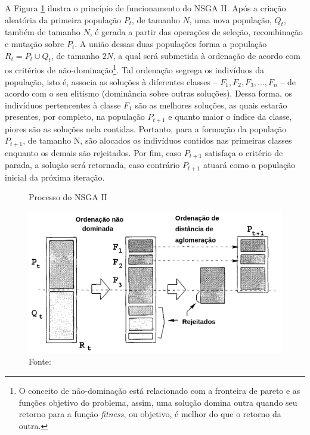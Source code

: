 \documentclass[11pt]{article}
\begin{document}
    A Figura \ref{fig:nsga2} ilustra o princípio de funcionamento do NSGA II. Após a criação aleatória da primeira população $P_t$, de tamanho $N$, uma nova população, $Q_t$, também de tamanho $N$, é gerada a partir das operações de seleção, recombinação e mutação sobre $P_t$. A união dessas duas populações forma a população $R_t = P_t \cup Q_t$, de tamanho $2N$, a qual será submetida à ordenação de acordo com os critérios de não-dominação\footnote{O conceito de não-dominação está relacionado com a fronteira de pareto e as funções objetivo do problema, assim, uma solução domina outra quando seu retorno para a função \textit{fitness}, ou objetivo, é melhor do que o retorno da outra.}. Tal ordenação segrega os indivíduos da população, isto é, associa as soluções à diferentes classes -- $F_1, F_2, F_3, ..., F_n$ -- de acordo com o seu elitismo (dominância sobre outras soluções). Dessa forma, os indivíduos pertencentes à classe $F_1$ são as melhores soluções, as quais estarão presentes, por completo, na população $P_{t+1}$ e quanto maior o índice da classe, piores são as soluções nela contidas. Portanto, para a formação da população $P_{t+1}$, de tamanho N, são alocados os indivíduos contidos nas primeiras classes enquanto os demais são rejeitados. Por fim, caso $P_{t+1}$ satisfaça o critério de parada, a solução será retornada, caso contrário $P_{t+1}$ atuará como a população inicial da próxima iteração. \cite{nsga2}
    
    \begin{figure}[H]
        \centering
        \caption{Processo do NSGA II}
        \includegraphics[scale=.6]{figuras/nsga2.png}
        \caption*{Fonte: }
        \label{fig:nsga2}
    \end{figure}

    
\end{document}

